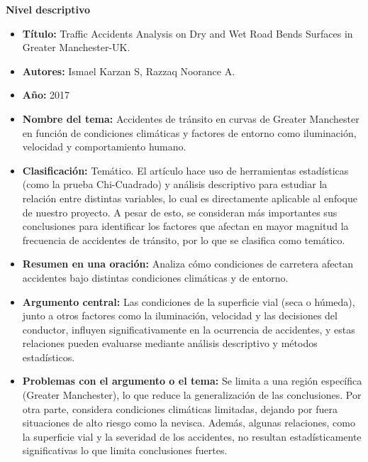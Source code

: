 \documentclass[12pt]{article}
\begin{document}
\textbf{Nivel descriptivo}
\begin{itemize}
    \item \textbf{Título:} Traffic Accidents Analysis on Dry and Wet Road Bends Surfaces in Greater Manchester-UK. 
    
    \item \textbf{Autores:} Ismael Karzan S, Razzaq Noorance A. 
    
    \item \textbf{Año:} 2017 
    
    \item \textbf{Nombre del tema:} Accidentes de tránsito en curvas de Greater Manchester en función de condiciones 
    climáticas y factores de entorno como iluminación, velocidad y comportamiento humano. 
    
    \item \textbf{Clasificación:} Temático. El artículo hace uso de herramientas estadísticas (como la prueba Chi-Cuadrado) y 
    análisis descriptivo para estudiar la relación entre distintas variables, lo cual es directamente aplicable al enfoque 
    de nuestro proyecto. A pesar de esto, se consideran más importantes sus conclusiones para identificar los factores que 
    afectan en mayor magnitud la frecuencia de accidentes de tránsito, por lo que se clasifica como temático.
    
    \item \textbf{Resumen en una oración:} Analiza cómo condiciones de carretera afectan accidentes bajo distintas condiciones 
    climáticas y de entorno. 
    
    \item \textbf{Argumento central:} Las condiciones de la superficie vial (seca o húmeda), junto a otros factores como la 
    iluminación, velocidad y las decisiones del conductor, influyen significativamente en la ocurrencia de accidentes, y estas 
    relaciones pueden evaluarse mediante análisis descriptivo y métodos estadísticos. 
    
    \item \textbf{Problemas con el argumento o el tema:} Se limita a una región específica (Greater Manchester), lo que reduce 
    la generalización de las conclusiones. Por otra parte, considera condiciones climáticas limitadas, dejando por fuera 
    situaciones de alto riesgo como la nevisca. Además, algunas relaciones, como la superficie vial y la severidad de los 
    accidentes, no resultan estadísticamente significativas lo que limita conclusiones fuertes.  \\
\end{itemize}
\end{document}
